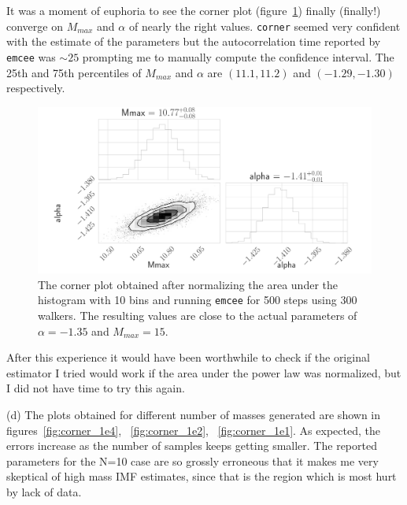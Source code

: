 \documentclass[12pt,usletter,english]{article}
\begin{document}
It was a moment of euphoria to see the corner plot
(figure~\ref{fig:corner_1e3}) finally (finally!)  converge on
$M_{max}$ and $\alpha$ of nearly the right values. \texttt{corner}
seemed very confident with the estimate of the parameters but the
autocorrelation time reported by \texttt{emcee} was $\sim 25$
prompting me to manually compute the confidence interval. The 25th and
75th percentiles of $M_{max}$ and $\alpha$ are $(11.1,11.2)$ and
$(-1.29,-1.30)$ respectively. 

\begin{figure}[!h]
  \centering \includegraphics[width=13cm]{theta_1e3.png}
  \caption{The corner plot obtained after normalizing the area under
    the histogram with 10 bins and running \texttt{emcee} for 500
    steps using 300 walkers. The resulting values are close to the
    actual parameters of $\alpha = -1.35$ and $M_{max}=15$.
    \label{fig:corner_1e3}}
\end{figure}

After this experience it would have been worthwhile to check if the
original estimator I tried would work if the area under the power law
was normalized, but I did not have time to try this again.

(d) The plots obtained for different number of masses generated are
shown in figures~\ref{fig:corner_1e4}, ~\ref{fig:corner_1e2},
~\ref{fig:corner_1e1}. As expected, the errors increase as the number
of samples keeps getting smaller. The reported parameters for the N=10
case are so grossly erroneous that it makes me very skeptical of high
mass IMF estimates, since that is the region which is most hurt by
lack of data.
\end{document}
